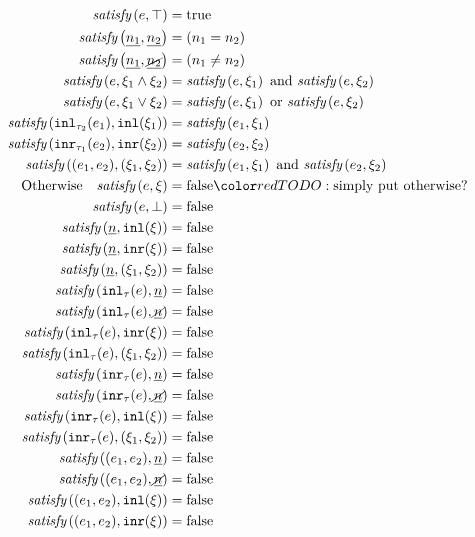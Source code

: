 \begin{subequations}\label{defn:satisfy}
\begin{align}
  \fsatisfy{e}{\ctruth} &= \true \label{defn:satisfy-truth}\\
  \fsatisfy{\hnum{n_1}}{\cnum{n_2}} &= (n_1 = n_2) \label{defn:num-satisfy-num}\\
  \fsatisfy{\hnum{n_1}}{\cnotnum{n_2}} &= (n_1 \neq n_2) \label{defn:num-satisfy-notnum}\\
  \fsatisfy{e}{\cand{\xi_1}{\xi_2}} &= \fsatisfy{e}{\xi_1} \text{ and } \fsatisfy{e}{\xi_2} \label{defn:satisfy-and}\\
  \fsatisfy{e}{\cor{\xi_1}{\xi_2}} &= \fsatisfy{e}{\xi_1} \text{ or } \fsatisfy{e}{\xi_2} \label{defn:satisfy-or}\\
  \fsatisfy{\hinl{\tau_2}{e_1}}{\cinl{\xi_1}} &= \fsatisfy{e_1}{\xi_1} \label{defn:inl-satisfy-inl}\\
  \fsatisfy{\hinr{\tau_1}{e_2}}{\cinr{\xi_2}} &= \fsatisfy{e_2}{\xi_2} \label{defn:inr-satisfy-inr}\\
  \fsatisfy{\hpair{e_1}{e_2}}{\cpair{\xi_1}{\xi_2}} &= \fsatisfy{e_1}{\xi_1} \text{ and } \fsatisfy{e_2}{\xi_2} \label{defn:pair-satisfy-pair}\\
  \text{Otherwise}\quad \fsatisfy{e}{\xi} &= \false \label{defn:not-satisfy}
  \todo{\text{simply put otherwise?}} \\
  \fsatisfy{e}{\cfalsity} &= \false \label{defn:satisfy-falsity}\\
  \fsatisfy{\hnum{n}}{\cinl{\xi}} &= \false \\
  \fsatisfy{\hnum{n}}{\cinr{\xi}} &= \false \\
  \fsatisfy{\hnum{n}}{\cpair{\xi_1}{\xi_2}} &= \false \\
  \fsatisfy{\hinl{\tau}{e}}{\cnum{n}} &= \false \\
  \fsatisfy{\hinl{\tau}{e}}{\cnotnum{n}} &= \false \\
  \fsatisfy{\hinl{\tau}{e}}{\cinr{\xi}} &= \false \\
  \fsatisfy{\hinl{\tau}{e}}{\cpair{\xi_1}{\xi_2}} &= \false \\
  \fsatisfy{\hinr{\tau}{e}}{\cnum{n}} &= \false \\
  \fsatisfy{\hinr{\tau}{e}}{\cnotnum{n}} &= \false \\
  \fsatisfy{\hinr{\tau}{e}}{\cinl{\xi}} &= \false \\
  \fsatisfy{\hinr{\tau}{e}}{\cpair{\xi_1}{\xi_2}} &= \false \\
  \fsatisfy{\hpair{e_1}{e_2}}{\cnum{n}} &= \false \\
  \fsatisfy{\hpair{e_1}{e_2}}{\cnotnum{n}} &= \false \\
  \fsatisfy{\hpair{e_1}{e_2}}{\cinl{\xi}} &= \false \\
  \fsatisfy{\hpair{e_1}{e_2}}{\cinr{\xi}} &= \false
\end{align}
\end{subequations}

